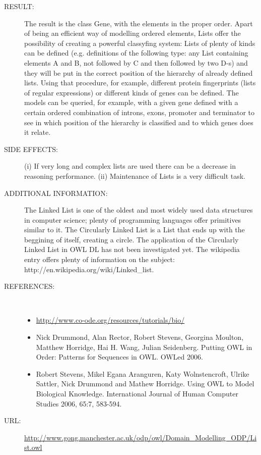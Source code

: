 \begin{description}
\item [RESULT:] The result is the class Gene, with the elements in the proper order. Apart of being an efficient way of modelling ordered elements, Lists offer the possibility of creating a powerful classyfing system: Lists of plenty of kinds can be defined (e.g. definitions of the following type: any List containing elements A and B, not followed by C and then followed by two D-s) and they will be put in the correct position of the hierarchy of already defined lists. Using that procedure, for example, different protein fingerprints (lists of regular expressions) or different kinds of genes can be defined. The models can be queried, for example, with a given gene defined with a certain ordered combination of introns, exons, promoter and terminator to see in which position of the hierarchy is classified and to which genes does it relate.

\item [SIDE EFFECTS:] (i) If very long and complex lists are used there can be a decrease in reasoning performance. (ii) Maintenance of Lists is a very difficult task.

\item [ADDITIONAL INFORMATION:] The Linked List is one of the oldest and most widely used data structures in computer science; plenty of programming languages offer primitives similar to it. The Circularly Linked List is a List that ends up with the beggining of itself, creating a circle. The application of the Circularly Linked List in OWL DL has not been investigated yet. The wikipedia entry offers plenty of information on the subject: http://en.wikipedia.org/wiki/Linked\_list.

\item [REFERENCES: ] ~\begin{itemize}
\item \url{http://www.co-ode.org/resources/tutorials/bio/}
\item Nick Drummond, Alan Rector, Robert Stevens, Georgina Moulton, Matthew Horridge, Hai H. Wang, Julian Seidenberg. Putting OWL in Order: Patterns for Sequences in OWL. OWLed 2006.
\item Robert Stevens, Mikel Egana Aranguren, Katy Wolnstencroft, Ulrike Sattler, Nick Drummond and Mathew Horridge. Using OWL to Model Biological Knowledge. International Journal of Human Computer Studies 2006, 65:7, 583-594.\end{itemize}
\item [URL: ] \url{http://www.gong.manchester.ac.uk/odp/owl/Domain_Modelling_ODP/List.owl} \end{description}